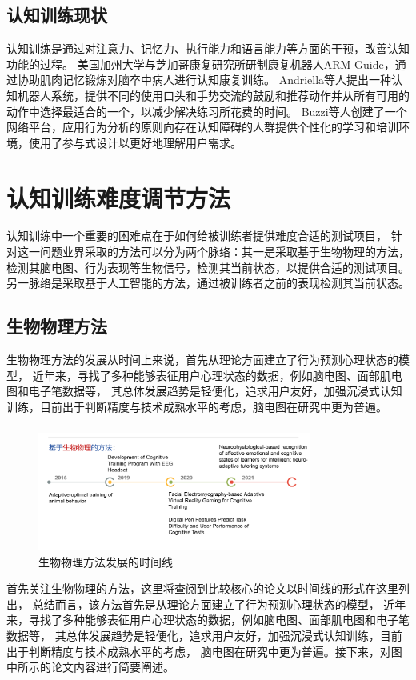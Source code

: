 \documentclass[12pt]{article}
\begin{document}
        \subsection{认知训练现状}

        认知训练是通过对注意力、记忆力、执行能力和语言能力等方面的干预，改善认知功能的过程。
        美国加州大学与芝加哥康复研究所研制康复机器人ARM Guide，通过协助肌肉记忆锻炼对脑卒中病人进行认知康复训练。
        Andriella等人\cite{ref5}提出一种认知机器人系统，提供不同的使用口头和手势交流的鼓励和推荐动作并从所有可用的动作中选择最适合的一个，以减少解决练习所花费的时间。
        Buzzi等人\cite{ref6}创建了一个网络平台，应用行为分析的原则向存在认知障碍的人群提供个性化的学习和培训环境，使用了参与式设计以更好地理解用户需求。
            \section{认知训练难度调节方法}
            认知训练中一个重要的困难点在于如何给被训练者提供难度合适的测试项目，
            针对这一问题业界采取的方法可以分为两个脉络：其一是采取基于生物物理的方法，
            检测其脑电图、行为表现等生物信号，检测其当前状态，以提供合适的测试项目。
            另一脉络是采取基于人工智能的方法，通过被训练者之前的表现检测其当前状态。
        \subsection{生物物理方法}
        生物物理方法的发展从时间上来说，首先从理论方面建立了行为预测心理状态的模型\cite{ref7}，
        近年来，寻找了多种能够表征用户心理状态的数据，例如脑电图\cite{ref8}、面部肌电图和电子笔数据等，
        其总体发展趋势是轻便化，追求用户友好，加强沉浸式认知训练，目前出于判断精度与技术成熟水平的考虑，脑电图在研究中更为普遍。
            \subsubsection{}
            \begin{figure}[H]
            	\centering
            	\includegraphics[width=0.8\textwidth]{images/timeline_bio.png}
            	\caption{生物物理方法发展的时间线}
            	\label{fig:label}
            \end{figure}
            首先关注生物物理的方法，这里将查阅到比较核心的论文以时间线的形式在这里列出，
            总结而言，该方法首先是从理论方面建立了行为预测心理状态的模型，
            近年来，寻找了多种能够表征用户心理状态的数据，例如脑电图、面部肌电图和电子笔数据等，
            其总体发展趋势是轻便化，追求用户友好，加强沉浸式认知训练，目前出于判断精度与技术成熟水平的考虑，
            脑电图在研究中更为普遍。接下来，对图中所示的论文内容进行简要阐述。
\end{document}
